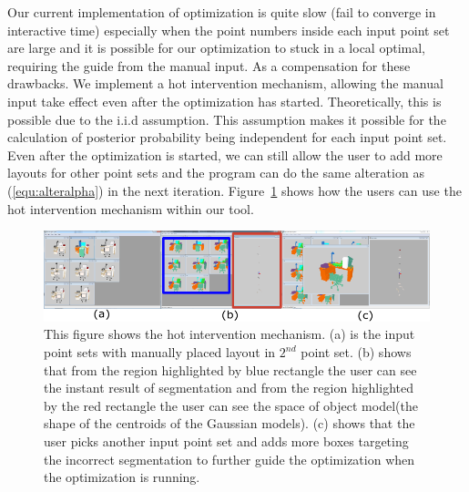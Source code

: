 Our current implementation of optimization is quite slow (fail to converge in interactive time) especially when the point numbers inside each input point set are large and it is possible for our optimization to stuck in a local optimal, requiring the guide from the manual input. As a compensation for these drawbacks. We implement a hot intervention mechanism, allowing the manual input take effect even after the optimization has started. Theoretically, this is possible due to the i.i.d assumption. 
This assumption makes it possible for the calculation of posterior probability being independent for each input point set. Even after the optimization is started, we can still allow the user to add more layouts for other point sets and the program can do the same alteration as (\ref{equ:alteralpha}) in the next iteration. Figure~\ref{fig:hi} shows how the users can use the hot intervention mechanism within our tool.
\begin{figure}[htb]
	\centering
	\includegraphics[width=\linewidth]{images/hotintervention/hi}
	\caption{\label{fig:hi}This figure shows the hot intervention mechanism. (a) is the input point sets with manually placed layout in $2^{nd}$ point set. (b) shows that from the region highlighted by blue rectangle the user can see the instant result of segmentation and from the region highlighted by the red rectangle the user can see the space of object model(the shape of the centroids of the Gaussian models). (c) shows that the user picks another input point set and adds more boxes targeting the incorrect segmentation to further guide the optimization when the optimization is running.}
\end{figure}
 